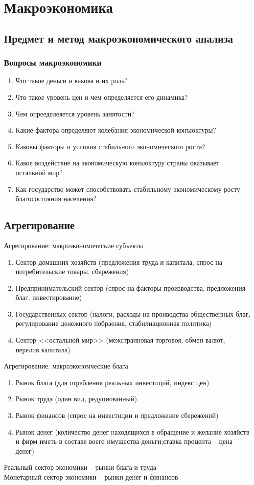 \documentclass[14pt]{extarticle}
\begin{document}
\section{Макроэкономика}
\subsection{Предмет и метод макроэкономического анализа}
\subsubsection{Вопросы макроэкономики}
\begin{enumerate}
    \item Что такое деньги и какова и их роль?
    \item Что такое уровень цен и чем определяется его динамика?
    \item Чем опрееделеяется уровень занятости?
    \item Какие фактора определяют колебания экономической конъюктуры?
    \item Каковы факторы и условия стабильного экономического роста?
    \item Какое воздействие на экономическую конъюктуру страны оказывает остальной мир?
    \item Как государство может способствовать стабильному экономическому росту благосостояния населения?
\end{enumerate}
\subsection{Агрегирование}
Агрегирование: макроэкономические субъекты
\begin{enumerate}
    \item Сектор домашних хозяйств (предложения труда и капитала, спрос на потребительские товары, сбережения)
    \item Предпринимательский сектор (спрос на факторы производства, предложения благ, инвестирование)
    \item Государственных сектор (налоги, расходы на проиводства общественных благ, регулирование денежного побраения, стабилиационная политика)
    \item Сектор <<остальной мир>> (межстранновая торговоя, обмен валют, перелив капитала)
\end{enumerate}
Агрегирование: макроэкономческие блага
\begin{enumerate}
    \item Рынок блага (для отребления  реальных инвестиций, индекс цен)
    \item Рынок труда (один вид, редуциованный)
    \item Рынок финансов (спрос на инвестиции и предложение сбережений)
    \item Рынок денег (количество денег находящихся в обращение и желание хозяйств и фирм иметь в составе воего имущества деньги;ставка процента -- цена денег)
\end{enumerate}
Реальный сектор экономики -- рынки блага и труда\\
Монетарный сектор экономики -- рынки денег и финансов
\end{document}
